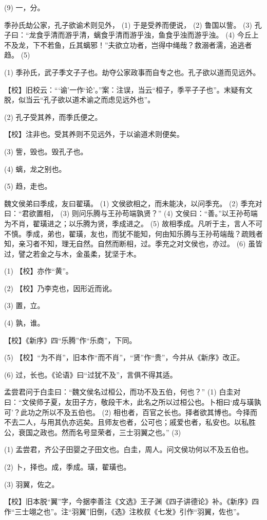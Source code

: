 \documentclass[12pt,UTF8]{ctexbook}
\begin{document}
(9) 一，分。

季孙氏劫公家，孔子欲谕术则见外， (1) 于是受养而便说， (2) 鲁国以訾。 (3) 孔子曰：“龙食乎清而游乎清，螭食乎清而游乎浊，鱼食乎浊而游乎浊。 (4) 今丘上不及龙，下不若鱼，丘其螭邪！”夫欲立功者，岂得中绳哉？救溺者濡，追逃者趋。 (5)

(1) 季孙氏，武子季文子子也。劫夺公家政事而自专之也。孔子欲以道而见远外。

【校】旧校云：“‘谕’一作‘论’。”案：注误，当云“桓子，季平子子也”。末疑有文脱，似当云“孔子欲以道术谕之而虑见远外也”。

(2) 孔子受其养，而季氏便之。

【校】注非也。受其养则不见远外，于以谕道术则便矣。

(3) 訾，毁也。毁孔子也。

(4) 螭，龙之别也。

(5) 趋，走也。

魏文侯弟曰季成，友曰翟璜。 (1) 文侯欲相之，而未能决，以问季充。 (2) 季充对曰：“君欲置相， (3) 则问乐腾与王孙苟端孰贤？” (4) 文侯曰：“善。”以王孙苟端为不肖，翟璜进之；以乐腾为贤，季成进之。 (5) 故相季成。凡听于主，言人不可不慎。季成，弟也，翟璜，友也，而犹不能知，何由知乐腾与王孙苟端哉？疏贱者知，亲习者不知，理无自然。自然而断相，过。季充之对文侯也，亦过。 (6) 虽皆过，譬之若金之与木，金虽柔，犹坚于木。

(1) 【校】亦作“黄”。

(2) 【校】乃李克也，因形近而讹。

(3) 置，立。

(4) 孰，谁。

【校】《新序》四“乐腾”作“乐商”，下同。

(5) 【校】“为不肖”，旧本作“而不肖”，“贤”作“贵”，今并从《新序》改正。

(6) 过，长也。《论语》曰“过犹不及”，言俱不得其适。

孟尝君问于白圭曰：“魏文侯名过桓公，而功不及五伯，何也？” (1) 白圭对曰：“文侯师子夏，友田子方，敬段干木，此名之所以过桓公也。卜相曰‘成与璜孰可’？此功之所以不及五伯也。 (2) 相也者，百官之长也。择者欲其博也。今择而不去二人，与用其仇亦远矣。且师友也者，公可也；戚爱也者，私安也。以私胜公，衰国之政也。然而名号显荣者，三士羽翼之也。” (3)

(1) 孟尝君，齐公子田婴之子田文也。白圭，周人。问文侯功何以不及五伯也。

(2) 卜，择也。成，季成。璜，翟璜也。

(3) 羽翼，佐之。

【校】旧本脱“翼”字，今据李善注《文选》王子渊《四子讲德论》补。《新序》四作“三士翊之也”。注“羽翼”旧倒，《选》注枚叔《七发》引作“羽翼，佐也”。
\end{document}
